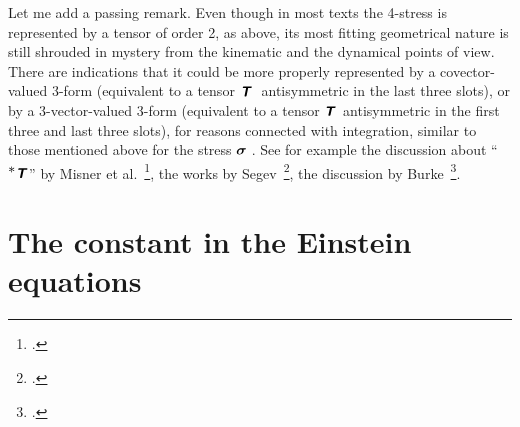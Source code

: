 \documentclass[a4paper,12pt,onecolumn,oneside,article,british]{memoir}
\makeatletter
\newcommand*{\mathte}[1]{\textbf{\textit{\textsf{#1}}}}
\newcommand*{\citep}{\footcites}
\newcommand*{\sect}{\S}%
\newcommand*{\chap}{ch.}%
\newcommand*{\etal}{{et al.}}
\newcommand*{\q}{}%
\DeclareRobustCommand*{\q}{%
  \mathbin{\mathpalette\bigcdot@{}}%
}
\newcommand*{\bigcdot@scalefactor}{0.7}
\newcommand*{\bigcdot@widthfactor}{1.5}
\newcommand*{\bigcdot@}[2]{%
  \sbox0{$#1\vcenter{}$}%
  \sbox2{$#1\cdot\m@th$}%
  \hbox to \bigcdot@widthfactor\wd2{%
    \hfil
    \raise\ht0\hbox{%
      \scalebox{\bigcdot@scalefactor}{%
        \lower\ht0\hbox{$#1\bullet\m@th$}%
      }%
    }%
    \hfil
  }%
}
\newcommand*{\yT}{\mathte{T}}
\renewcommand*{\i}{\indices}
\newcommand*{\yt}{\bm{\sigma}}
\makeatother
\begin{document}
\medskip


Let me add a passing remark. Even though in most texts the 4-stress is
represented by a tensor of order 2, as above, its most fitting geometrical
nature is still shrouded in mystery from the kinematic and the dynamical
points of view. There are indications that it could be more properly
represented by a covector-valued 3-form (equivalent to a tensor
$\yT\i{_{\q\;\q\q\q}}$ antisymmetric in the last three slots), or by a
3-vector-valued 3-form (equivalent to a tensor $\yT\i{^{\q\q\q}_{\q\q\q}}$
antisymmetric in the first three and last three slots), for reasons
connected with integration, similar to those mentioned above for the stress
$\yt\i{_{\q\;\q\q}}$. See for example the discussion about
\enquote{$^{\displaystyle *}\mathte{T}$} by Misner
\etal~\citep[\chap~15]{misneretal1970_r1973}, the works by
Segev~\citep{segev2002,segev1986,segevetal1999,segev2000,segev2000b}, the
discussion by Burke~\citep[\sect~41]{burke1985_r1987}.

\section{The constant in the Einstein equations}
\label{sec:einstein_eq}
\end{document}
